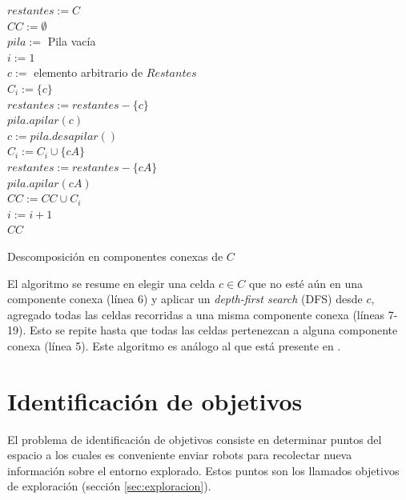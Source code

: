 \begin{algorithm}[H]
\SetAlgoLined
  $restantes := C$ \\
  $CC := \emptyset$ \\
  $pila :=$ Pila vacía \\
  $i := 1$ \\
   {
    $c :=$ elemento arbitrario de $Restantes$ \\


    $C_i :=  \{c\}$ \\
    $restantes := restantes - \{c\}$ \\
    $pila.apilar(c)$ \\
     {
      $c := pila.desapilar()$ \\
       {
         {
          $C_i :=  C_i \cup \{cA\}$ \\
          $restantes := restantes - \{cA\}$ \\
          $pila.apilar(cA)$ \\
        }
      }
    }
    $CC := CC \cup C_i$ \\
    $i := i + 1$ \\
  }
  \Return $CC$ 

  \caption{Descomposición en componentes conexas de $C$}
  \label{alg:compcon}
\end{algorithm}

El algoritmo se resume en elegir una celda $c\in C$ que no esté aún en una
componente conexa (línea 6) y aplicar un \emph{depth-first search} (DFS) desde
$c$, agregado todas las celdas recorridas a una misma componente conexa (líneas
7-19). Esto se repite hasta que todas las celdas pertenezcan a alguna
componente conexa (línea 5). Este algoritmo es análogo al que está presente en
\cite{hopcroft1973algorithm}.

\section{Identificación de objetivos}\label{sec:pc:idobj}
El problema de identificación de objetivos consiste en determinar puntos
del espacio a los cuales es conveniente enviar robots para recolectar nueva
información sobre el entorno explorado. Estos puntos son los llamados objetivos
de exploración (sección \ref{sec:exploracion}). 

